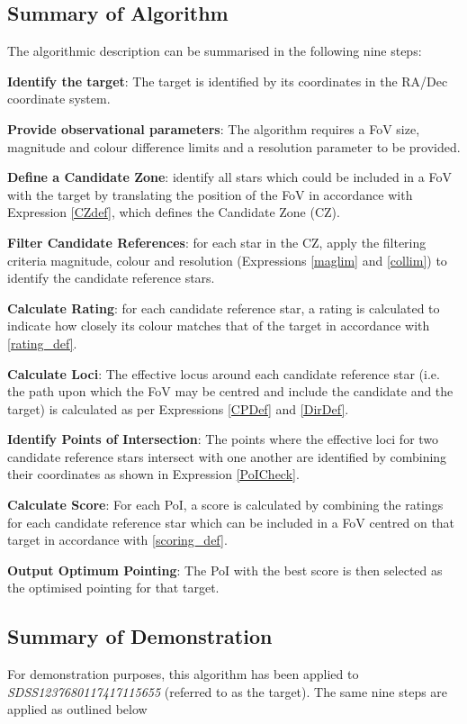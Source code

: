 \documentclass[referee]{aa}
\begin{document}
\subsection{Summary of Algorithm}
The algorithmic description can be summarised in the following nine steps:

\textbf{Identify the target}: The target is identified by its coordinates in the RA/Dec coordinate system.

\textbf{Provide observational parameters}: The algorithm requires a FoV size, magnitude and colour difference limits and a resolution parameter to be provided.

\textbf{Define a Candidate Zone}: identify all stars which could be included in a FoV with the target by translating the position of the FoV in accordance with Expression \ref{CZdef}, which defines the Candidate Zone (CZ).

\textbf{Filter Candidate References}: for each star in the CZ, apply the filtering criteria magnitude, colour and resolution (Expressions \ref{maglim} and \ref{collim}) to identify the candidate reference stars.

\textbf{Calculate Rating}: for each candidate reference star, a rating is calculated to indicate how closely its colour matches that of the target in accordance with \ref{rating_def}.

\textbf{Calculate Loci}: The effective locus around each candidate reference star (i.e. the path upon which the FoV may be centred and include the candidate and the target) is calculated as per Expressions \ref{CPDef} and \ref{DirDef}.

\textbf{Identify Points of Intersection}: The points where the effective loci for two candidate reference stars intersect with one another are identified by combining their coordinates as shown in Expression \ref{PoICheck}.

\textbf{Calculate Score}: For each PoI, a score is calculated by combining the ratings for each candidate reference star which can be included in a FoV centred on that target in accordance with \ref{scoring_def}.

\textbf{Output Optimum Pointing}: The PoI with the best score is then selected as the optimised pointing for that target.

\subsection{Summary of Demonstration}
For demonstration purposes, this algorithm has been applied to \textit{SDSS1237680117417115655} (referred to as the target). The same nine steps are applied as outlined below
\end{document}
